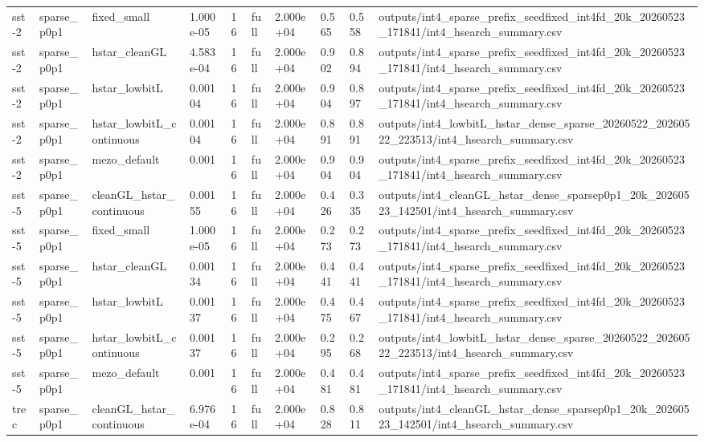 \begin{table}[t]
\begin{tabular}{llllllllll}
sst-2 & sparse\_p0p1 & fixed\_small & 1.000e-05 & 16 & full & 2.000e+04 & 0.565 & 0.558 & outputs/int4\_sparse\_prefix\_seedfixed\_int4fd\_20k\_20260523\_171841/int4\_hsearch\_summary.csv \\
sst-2 & sparse\_p0p1 & hstar\_cleanGL & 4.583e-04 & 16 & full & 2.000e+04 & 0.902 & 0.894 & outputs/int4\_sparse\_prefix\_seedfixed\_int4fd\_20k\_20260523\_171841/int4\_hsearch\_summary.csv \\
sst-2 & sparse\_p0p1 & hstar\_lowbitL & 0.00104 & 16 & full & 2.000e+04 & 0.904 & 0.897 & outputs/int4\_sparse\_prefix\_seedfixed\_int4fd\_20k\_20260523\_171841/int4\_hsearch\_summary.csv \\
sst-2 & sparse\_p0p1 & hstar\_lowbitL\_continuous & 0.00104 & 16 & full & 2.000e+04 & 0.891 & 0.891 & outputs/int4\_lowbitL\_hstar\_dense\_sparse\_20260522\_20260522\_223513/int4\_hsearch\_summary.csv \\
sst-2 & sparse\_p0p1 & mezo\_default & 0.001 & 16 & full & 2.000e+04 & 0.904 & 0.904 & outputs/int4\_sparse\_prefix\_seedfixed\_int4fd\_20k\_20260523\_171841/int4\_hsearch\_summary.csv \\
sst-5 & sparse\_p0p1 & cleanGL\_hstar\_continuous & 0.00155 & 16 & full & 2.000e+04 & 0.426 & 0.335 & outputs/int4\_cleanGL\_hstar\_dense\_sparsep0p1\_20k\_20260523\_142501/int4\_hsearch\_summary.csv \\
sst-5 & sparse\_p0p1 & fixed\_small & 1.000e-05 & 16 & full & 2.000e+04 & 0.273 & 0.273 & outputs/int4\_sparse\_prefix\_seedfixed\_int4fd\_20k\_20260523\_171841/int4\_hsearch\_summary.csv \\
sst-5 & sparse\_p0p1 & hstar\_cleanGL & 0.00134 & 16 & full & 2.000e+04 & 0.441 & 0.441 & outputs/int4\_sparse\_prefix\_seedfixed\_int4fd\_20k\_20260523\_171841/int4\_hsearch\_summary.csv \\
sst-5 & sparse\_p0p1 & hstar\_lowbitL & 0.00137 & 16 & full & 2.000e+04 & 0.475 & 0.467 & outputs/int4\_sparse\_prefix\_seedfixed\_int4fd\_20k\_20260523\_171841/int4\_hsearch\_summary.csv \\
sst-5 & sparse\_p0p1 & hstar\_lowbitL\_continuous & 0.00137 & 16 & full & 2.000e+04 & 0.295 & 0.268 & outputs/int4\_lowbitL\_hstar\_dense\_sparse\_20260522\_20260522\_223513/int4\_hsearch\_summary.csv \\
sst-5 & sparse\_p0p1 & mezo\_default & 0.001 & 16 & full & 2.000e+04 & 0.481 & 0.481 & outputs/int4\_sparse\_prefix\_seedfixed\_int4fd\_20k\_20260523\_171841/int4\_hsearch\_summary.csv \\
trec & sparse\_p0p1 & cleanGL\_hstar\_continuous & 6.976e-04 & 16 & full & 2.000e+04 & 0.828 & 0.811 & outputs/int4\_cleanGL\_hstar\_dense\_sparsep0p1\_20k\_20260523\_142501/int4\_hsearch\_summary.csv \\

\end{tabular}
\end{table}
